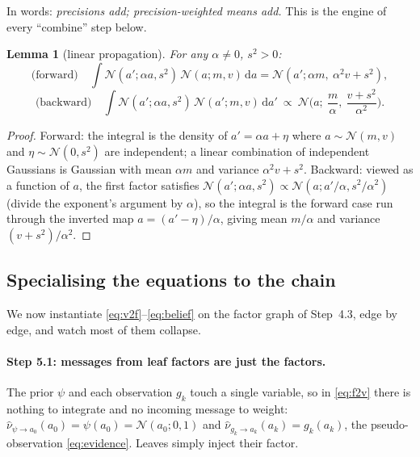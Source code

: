 \documentclass[11pt]{article}
\newtheorem{lemma}{Lemma}
\theoremstyle{definition}
\theoremstyle{remark}
\newcommand{\N}{\mathcal{N}}
\newcommand{\dd}{\mathrm{d}}
\begin{document}
\noindent In words: \emph{precisions add; precision-weighted means add.}
This is the engine of every ``combine'' step below.

\begin{lemma}[linear propagation]\label{lem:lin}
For any $\alpha\neq0$, $s^2>0$:
\[
  \text{(forward)}\quad
  \int\N(a';\alpha a,s^2)\,\N(a;m,v)\,\dd a=\N(a';\alpha m,\ \alpha^2v+s^2),
\]
\[
  \text{(backward)}\quad
  \int\N(a';\alpha a,s^2)\,\N(a';m,v)\,\dd a'\ \propto\
  \N\!\Big(a;\ \frac m\alpha,\ \frac{v+s^2}{\alpha^2}\Big).
\]
\end{lemma}
\begin{proof}
Forward: the integral is the density of $a'=\alpha a+\eta$ where
$a\sim\N(m,v)$ and $\eta\sim\N(0,s^2)$ are independent; a linear
combination of independent Gaussians is Gaussian with mean $\alpha m$ and
variance $\alpha^2v+s^2$. Backward: viewed as a function of $a$, the first
factor satisfies $\N(a';\alpha a,s^2)\propto\N(a;a'/\alpha,s^2/\alpha^2)$
(divide the exponent's argument by $\alpha$), so the integral is the forward
case run through the inverted map $a=(a'-\eta)/\alpha$, giving mean
$m/\alpha$ and variance $(v+s^2)/\alpha^2$.
\end{proof}

\subsection{Specialising the equations to the chain}\label{sec:special}

We now instantiate \eqref{eq:v2f}--\eqref{eq:belief} on the factor graph of
Step~4.3, edge by edge, and watch most of them collapse.

\paragraph{Step 5.1: messages from leaf factors are just the factors.}
The prior $\psi$ and each observation $g_k$ touch a single variable, so in
\eqref{eq:f2v} there is nothing to integrate and no incoming message to
weight: $\hat\nu_{\psi\to a_0}(a_0)=\psi(a_0)=\N(a_0;0,1)$ and
$\hat\nu_{g_k\to a_k}(a_k)=g_k(a_k)$, the pseudo-observation
\eqref{eq:evidence}. Leaves simply inject their factor.
\end{document}
